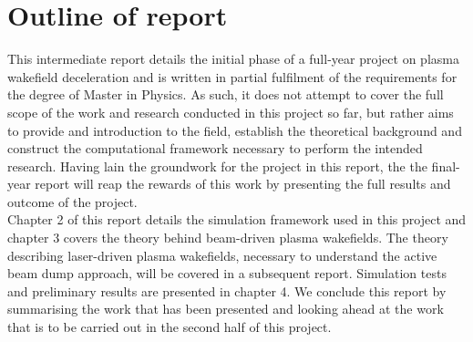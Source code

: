 \section{Outline of report}
This intermediate report details the initial phase of a full-year project on plasma wakefield deceleration and is written in partial fulfilment of the requirements for the degree of Master in Physics. As such, it does not attempt to cover the full scope of the work and research conducted in this project so far, but rather aims to provide and introduction to the field, establish the theoretical background and construct the computational framework necessary to perform the intended research. Having lain the groundwork for the project in this report, the the final-year report will reap the rewards of this work by presenting the full results and outcome of the project. \\
\indent Chapter 2 of this report details the simulation framework used in this project and  chapter 3 covers the theory behind beam-driven plasma wakefields. The theory describing laser-driven plasma wakefields, necessary to understand the active beam dump approach, will be covered in a subsequent report. Simulation tests and preliminary results are presented in chapter 4. We conclude this report by summarising the work that has been presented and looking ahead at the work that is to be carried out in the second half of this project.










